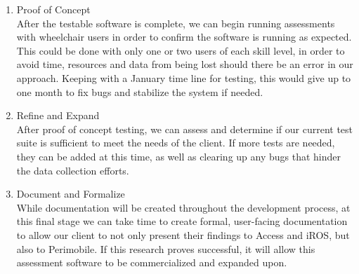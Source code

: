 \documentclass[letterpaper,10pt,titlepage]{article}
\begin{document}
\begin{enumerate}
\item \large{Proof of Concept}\\
\normalsize After the testable software is complete, we can begin running assessments with wheelchair users in order to confirm the software is running as expected. This could be done with only one or two users of each skill level, in order to avoid time, resources and data from being lost should there be an error in our approach. Keeping with a January time line for testing, this would give up to one month to fix bugs and stabilize the system if needed. 
\item \large{Refine and Expand}\\
\normalsize After proof of concept testing, we can assess and determine if our current test suite is sufficient to meet the needs of the client. If more tests are needed, they can be added at this time, as well as clearing up any bugs that hinder the data collection efforts. 
\item \large {Document and Formalize}\\
\normalsize While documentation will be created throughout the development process, at this final stage we can take time to create formal, user-facing documentation to allow our client to not only present their findings to Access and iROS, but also to Perimobile. If this research proves successful, it will allow this assessment software to be commercialized and expanded upon.
\end{enumerate}
\end{document}
